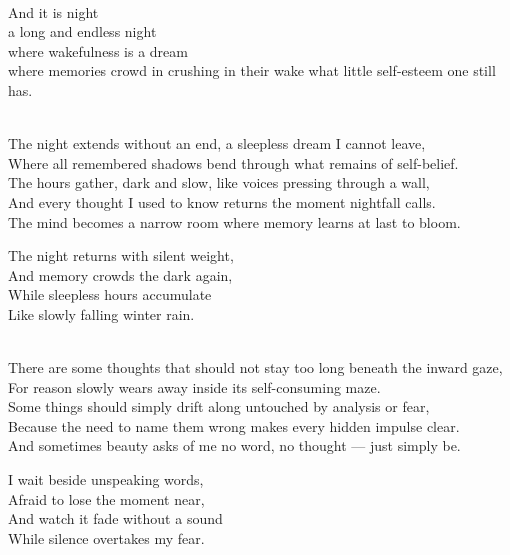 \begin{lyrics}


\\
And it is night\\
a long and endless night\\
where wakefulness is a dream\\
where memories crowd in crushing in their wake what little self-esteem one still has.

\\
The night extends without an end, a sleepless dream I cannot leave,\\
Where all remembered shadows bend through what remains of self-belief.\\
The hours gather, dark and slow, like voices pressing through a wall,\\
And every thought I used to know returns the moment nightfall calls.\\
The mind becomes a narrow room where memory learns at last to bloom.

The night returns with silent weight,\\
And memory crowds the dark again,\\
While sleepless hours accumulate\\
Like slowly falling winter rain.


\\
There are some thoughts that should not stay too long beneath the inward gaze,\\
For reason slowly wears away inside its self-consuming maze.\\
Some things should simply drift along untouched by analysis or fear,\\
Because the need to name them wrong makes every hidden impulse clear.\\
And sometimes beauty asks of me no word, no thought — just simply be.

I wait beside unspeaking words,\\
Afraid to lose the moment near,\\
And watch it fade without a sound\\
While silence overtakes my fear.


\end{lyrics}
